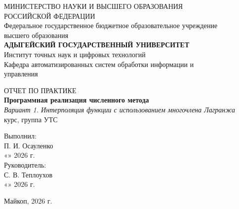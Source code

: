 \documentclass[12pt,a4paper]{article}
\begin{document}
\pagestyle{empty}
\begin{center}
    {\fontsize{12pt}{14pt}\selectfont
        МИНИСТЕРСТВО НАУКИ И ВЫСШЕГО ОБРАЗОВАНИЯ\\
        РОССИЙСКОЙ ФЕДЕРАЦИИ\\
        Федеральное государственное бюджетное образовательное учреждение\\
        высшего образования\\
        \textbf{АДЫГЕЙСКИЙ ГОСУДАРСТВЕННЫЙ УНИВЕРСИТЕТ}\\
    }
    \vspace{0.3cm}
    {\fontsize{12pt}{14pt}\selectfont
        Институт точных наук и цифровых технологий\\
        Кафедра автоматизированных систем обработки информации и\\
        управления\\
    }
\end{center}
\vspace{4.5cm}
\begin{center}
    {\fontsize{14pt}{16pt}\selectfont ОТЧЕТ ПО ПРАКТИКЕ\\}
    \vspace{0.5cm}
    {\fontsize{16pt}{18pt}\selectfont \textbf{Программная реализация численного метода}\\}
   {\fontsize{14pt}{16pt}\selectfont \textit{Вариант 1. Интерполяция функции с использованием многочлена Лагранжа}\\}
    \vspace{0.8cm}
    {\fontsize{12pt}{14pt} курс, группа УТС\\}
\end{center}
\vspace{3cm}
\hfill
\begin{minipage}{0.48\textwidth}
    {\normalsize Выполнил:\\
    \underline{\hspace{3.5cm}} П. И. Осауленко\\
    «\underline{\hspace{0.8cm}}» \underline{\hspace{2.2cm}} 2026 г.\\
    \vspace{0.6cm}
    Руководитель:\\
    \underline{\hspace{3.5cm}} С. В. Теплоухов\\
    «\underline{\hspace{0.8cm}}» \underline{\hspace{2.2cm}} 2026 г.}
\end{minipage}
\vfill 
\begin{center}
    {\normalsize Майкоп, 2026 г.}
\end{center}
\newpage
\end{document}
